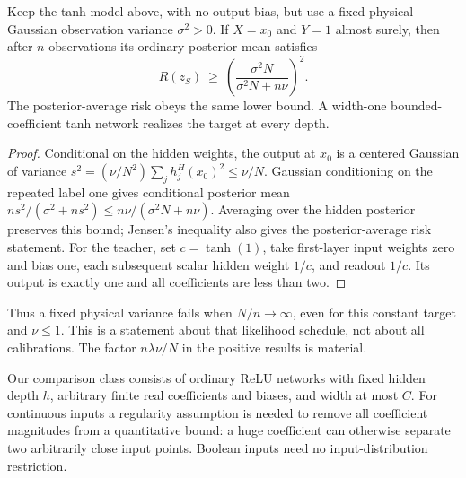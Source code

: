 \documentclass[11pt]{article}
\theoremstyle{remark}\newtheorem{remark}[theorem]{Remark}
\begin{document}
\begin{proposition}
\label{prop:fixed-variance-obstruction}
Keep the tanh model above, with no output bias, but use a fixed physical
Gaussian observation variance $\sigma^2>0$. If $X=x_0$ and $Y=1$
almost surely, then after $n$ observations its ordinary posterior mean
satisfies
\[
 R(\bar z_S)\ \ge\
 \left(\frac{\sigma^2N}{\sigma^2N+n\nu}\right)^2.
\]
The posterior-average risk obeys the same lower bound. A width-one
bounded-coefficient tanh network realizes the target at every depth.
\end{proposition}
\begin{proof}
Conditional on the hidden weights, the output at $x_0$ is a centered
Gaussian of variance
$s^2=(\nu/N^2)\sum_j h_j^H(x_0)^2\le\nu/N$. Gaussian conditioning
on the repeated label one gives conditional posterior mean
$n s^2/(\sigma^2+n s^2)\le n\nu/(\sigma^2N+n\nu)$.
Averaging over the hidden posterior preserves this bound; Jensen's
inequality also gives the posterior-average risk statement.
For the teacher, set $c=\tanh(1)$, take first-layer input weights zero
and bias one, each subsequent scalar hidden weight $1/c$, and readout
$1/c$. Its output is exactly one and all coefficients are less than two.
\end{proof}
Thus a fixed physical variance fails when $N/n\to\infty$, even for
this constant target and $\nu\le1$. This is a statement about that
likelihood schedule, not about all calibrations. The factor
$n\lambda\nu/N$ in the positive results is material.

Our comparison class consists of ordinary ReLU networks with fixed
hidden depth $h$, arbitrary finite real coefficients and biases, and
width at most $C$. For continuous inputs a regularity assumption is
needed to remove all coefficient magnitudes from a quantitative bound:
a huge coefficient can otherwise separate two arbitrarily close input
points. Boolean inputs need no input-distribution restriction.
\end{document}
